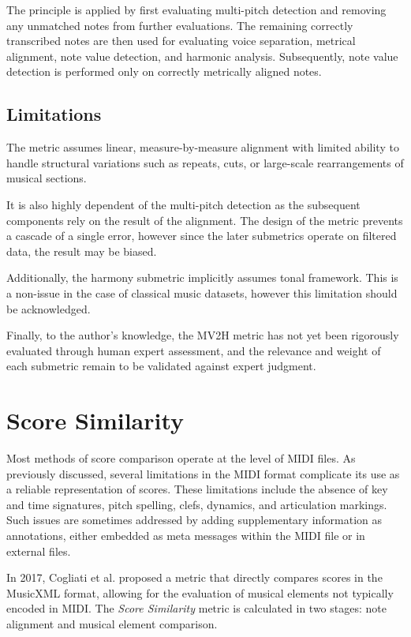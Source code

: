 The principle is applied by first evaluating multi-pitch detection and removing any unmatched notes from further evaluations. The remaining correctly transcribed notes are then used for evaluating voice separation, metrical alignment, note value detection, and harmonic analysis. Subsequently, note value detection is performed only on correctly metrically aligned notes.

\subsection{Limitations}

The metric assumes linear, measure-by-measure alignment with limited ability to handle structural variations such as repeats, cuts, or large-scale rearrangements of musical sections. 

It is also highly dependent of the multi-pitch detection as the subsequent components rely on the result of the alignment. The design of the metric prevents a cascade of a single error, however since the later submetrics operate on filtered data, the result may be biased.

Additionally, the harmony submetric implicitly assumes tonal framework. This is a non-issue in the case of classical music datasets, however this limitation should be acknowledged.

Finally, to the author’s knowledge, the MV2H metric has not yet been rigorously evaluated through human expert assessment, and the relevance and weight of each submetric remain to be validated against expert judgment.

\section{Score Similarity}

Most methods of score comparison operate at the level of MIDI files. As previously discussed, several limitations in the MIDI format complicate its use as a reliable representation of scores. These limitations include the absence of key and time signatures, pitch spelling, clefs, dynamics, and articulation markings. Such issues are sometimes addressed by adding supplementary information as annotations, either embedded as meta messages within the MIDI file or in external files.

In 2017, Cogliati et al. \cite{Cogliati2017} proposed a metric that directly compares scores in the MusicXML format, allowing for the evaluation of musical elements not typically encoded in MIDI. The \emph{Score Similarity} metric is calculated in two stages: note alignment and musical element comparison.


